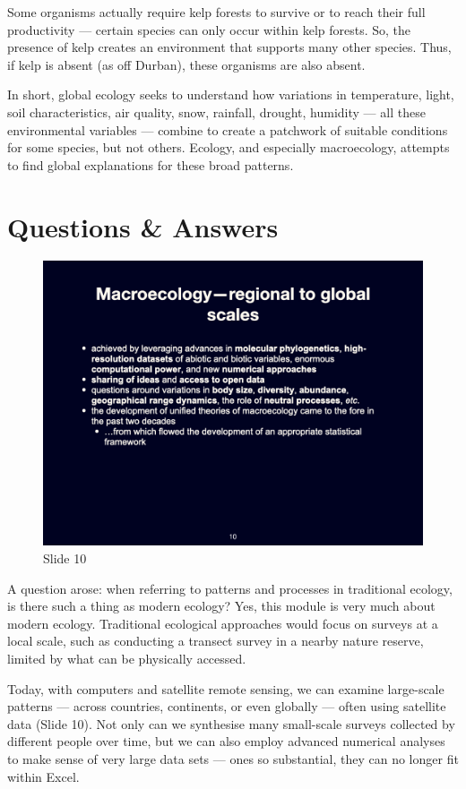 \documentclass[
  11pt,
]{book}
\begin{document}
Some organisms actually require kelp forests to survive or to reach
their full productivity --- certain species can only occur within kelp
forests. So, the presence of kelp creates an environment that supports
many other species. Thus, if kelp is absent (as off Durban), these
organisms are also absent.

In short, global ecology seeks to understand how variations in
temperature, light, soil characteristics, air quality, snow, rainfall,
drought, humidity --- all these environmental variables --- combine to
create a patchwork of suitable conditions for some species, but not
others. Ecology, and especially macroecology, attempts to find global
explanations for these broad patterns.

\section{Questions \& Answers}\label{questions-answers-1}

\begin{figure}[ht]
\centering
\includegraphics[width=0.8\linewidth]{../images/BDC334/BDC334-010.jpeg}
\caption*{Slide 10}
\end{figure}

A question arose: when referring to patterns and processes in
traditional ecology, is there such a thing as modern ecology? Yes, this
module is very much about modern ecology. Traditional ecological
approaches would focus on surveys at a local scale, such as conducting a
transect survey in a nearby nature reserve, limited by what can be
physically accessed.

Today, with computers and satellite remote sensing, we can examine
large-scale patterns --- across countries, continents, or even globally
--- often using satellite data (Slide 10). Not only can we synthesise
many small-scale surveys collected by different people over time, but we
can also employ advanced numerical analyses to make sense of very large
data sets --- ones so substantial, they can no longer fit within Excel.
\end{document}
